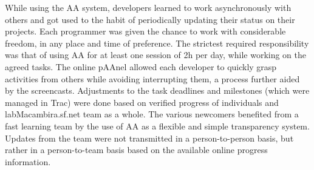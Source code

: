 \documentclass{article}
\begin{document}
While using the AA system, developers learned to work asynchronously with others
and got used to the habit of periodically updating their status on their
projects. Each programmer was given the chance to work with considerable
freedom, in any place and time of preference. The strictest required
responsibility was that of using AA for at least one session of 2h per day,
while working on the agreed tasks.  The online pAAnel allowed each
developer to quickly grasp activities from others while avoiding interrupting them, a
process further aided by the screencasts. Adjustments to the task deadlines and
milestones (which were managed in Trac) were done based on verified progress of
individuals and labMacambira.sf.net team as a whole. The various newcomers
benefited from a fast learning team by the use of AA as a flexible and simple
transparency system. Updates from the team were not transmitted in a
person-to-person basis, but rather in a person-to-team basis based on the
available online progress information.
\end{document}
